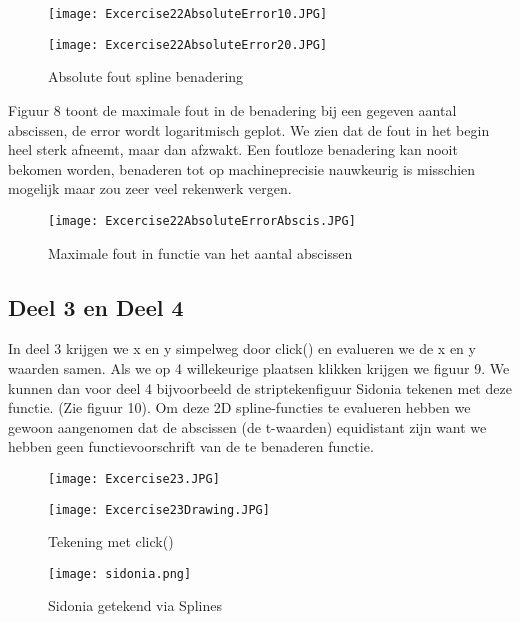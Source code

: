 \documentclass[a4paper]{article}
\begin{document}
\begin{figure}
\caption{Absolute fout spline benadering}
	\begin{minipage}{.5\textwidth}
		\centering
		\texttt{[image: Excercise22AbsoluteError10.JPG]}
	\end{minipage}
	\begin{minipage}{.5\textwidth}
		\centering
		\texttt{[image: Excercise22AbsoluteError20.JPG]}
	\end{minipage}
\end{figure}
Figuur 8 toont de maximale fout in de benadering bij een gegeven aantal abscissen, de error wordt logaritmisch geplot.
We zien dat de fout in het begin heel sterk afneemt, maar dan afzwakt. Een foutloze benadering  kan nooit bekomen worden, benaderen tot op machineprecisie nauwkeurig is misschien mogelijk maar zou zeer veel rekenwerk vergen.
\begin{figure}
\caption{Maximale fout in functie van het aantal abscissen}
\texttt{[image: Excercise22AbsoluteErrorAbscis.JPG]}
\end{figure}

\subsection{Deel 3 en Deel 4}
In deel 3 krijgen we x en y simpelweg door click() en evalueren we de x en y waarden samen. Als we op 4 willekeurige plaatsen klikken krijgen we figuur 9. We kunnen dan voor deel 4 bijvoorbeeld de striptekenfiguur Sidonia tekenen met deze functie. (Zie figuur 10). Om deze 2D spline-functies te evalueren hebben we gewoon aangenomen dat de abscissen (de t-waarden) equidistant zijn want we hebben geen functievoorschrift van de te benaderen functie.
\begin{figure}
\caption{Tekening met click()}
	\begin{minipage}{.5\textwidth}
		\centering
		\texttt{[image: Excercise23.JPG]}
	\end{minipage}
	\begin{minipage}{.5\textwidth}
		\centering
		\texttt{[image: Excercise23Drawing.JPG]}
	\end{minipage}
\end{figure}


\begin{figure}
\caption{Sidonia getekend via Splines}
\texttt{[image: sidonia.png]}
\end{figure}
\end{document}
